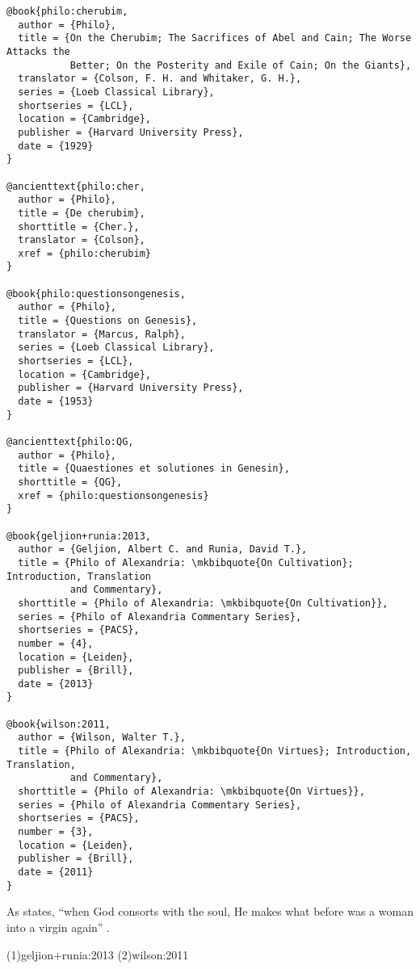 \documentclass[a4paper]{article}
\begin{document}
\begin{verbatim}
@book{philo:cherubim,
  author = {Philo},
  title = {On the Cherubim; The Sacrifices of Abel and Cain; The Worse Attacks the
           Better; On the Posterity and Exile of Cain; On the Giants},
  translator = {Colson, F. H. and Whitaker, G. H.},
  series = {Loeb Classical Library},
  shortseries = {LCL},
  location = {Cambridge},
  publisher = {Harvard University Press},
  date = {1929}
}

@ancienttext{philo:cher,
  author = {Philo},
  title = {De cherubim},
  shorttitle = {Cher.},
  translator = {Colson},
  xref = {philo:cherubim}
}

@book{philo:questionsongenesis,
  author = {Philo},
  title = {Questions on Genesis},
  translator = {Marcus, Ralph},
  series = {Loeb Classical Library},
  shortseries = {LCL},
  location = {Cambridge},
  publisher = {Harvard University Press},
  date = {1953}
}

@ancienttext{philo:QG,
  author = {Philo},
  title = {Quaestiones et solutiones in Genesin},
  shorttitle = {QG},
  xref = {philo:questionsongenesis}
}

@book{geljion+runia:2013,
  author = {Geljion, Albert C. and Runia, David T.},
  title = {Philo of Alexandria: \mkbibquote{On Cultivation}; Introduction, Translation
           and Commentary},
  shorttitle = {Philo of Alexandria: \mkbibquote{On Cultivation}},
  series = {Philo of Alexandria Commentary Series},
  shortseries = {PACS},
  number = {4},
  location = {Leiden},
  publisher = {Brill},
  date = {2013}
}

@book{wilson:2011,
  author = {Wilson, Walter T.},
  title = {Philo of Alexandria: \mkbibquote{On Virtues}; Introduction, Translation,
           and Commentary},
  shorttitle = {Philo of Alexandria: \mkbibquote{On Virtues}},
  series = {Philo of Alexandria Commentary Series},
  shortseries = {PACS},
  number = {3},
  location = {Leiden},
  publisher = {Brill},
  date = {2011}
}
\end{verbatim}

\begin{verbcite}
  As \citeauthor{philo:cher} states, “when God consorts with the soul, He makes
  what before was a woman into a virgin again” .
\end{verbcite}
\examplecite(1){geljion+runia:2013}
\examplecite(2){wilson:2011}
\exampleancientsources
\examplesecondarysources
\examplebibliography
{}
\end{document}
